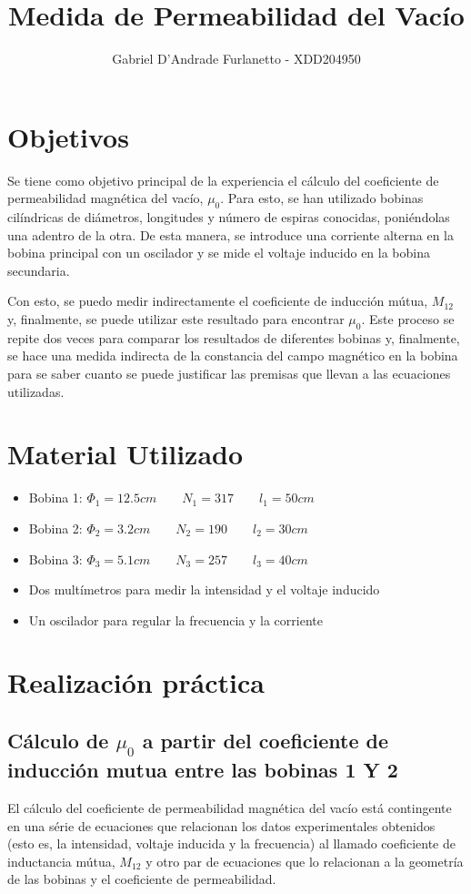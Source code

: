 \documentclass[a4paper,12pt]{article}
\begin{document}
\title{Medida de Permeabilidad del Vacío}

\author{Gabriel D'Andrade Furlanetto - XDD204950}

\maketitle
\section{Objetivos}
Se tiene como objetivo principal de la experiencia el cálculo del coeficiente de permeabilidad magnética del vacío, $\mu_0$. Para esto, se han utilizado bobinas cilíndricas de diámetros, longitudes y número de espiras conocidas, 
poniéndolas una adentro de la otra. De esta manera, se introduce una corriente alterna en la bobina principal con un oscilador y se mide el voltaje inducido en la bobina secundaria. 

Con esto, se puedo medir indirectamente el coeficiente de inducción mútua, $M_{12}$ y, finalmente, se puede utilizar este resultado para encontrar $\mu_0$.
Este proceso se repite dos veces para comparar los resultados de diferentes bobinas y, finalmente, se hace una medida indirecta de la constancia del campo magnético en la bobina para se saber cuanto se puede justificar las premisas que llevan a las ecuaciones utilizadas.


\section{Material Utilizado}
\begin{itemize}
    \item Bobina 1: $\Phi_1 = 12.5cm \qquad N_1=317 \qquad l_1=50cm$
    \item Bobina 2:  $\Phi_2 = 3.2cm \qquad N_2=190 \qquad l_2=30cm$
    \item Bobina 3:  $\Phi_3 = 5.1cm \qquad N_3=257 \qquad l_3=40cm$
    \item Dos multímetros para medir la intensidad y el voltaje inducido
    \item Un oscilador para regular la frecuencia y la corriente
\end{itemize}
\section{Realización práctica}

\subsection{Cálculo de $\mu_0$ a partir del coeficiente de inducción mutua entre las bobinas 1 Y 2}
El cálculo del coeficiente de permeabilidad magnética del vacío está contingente en una série de ecuaciones que relacionan los datos experimentales obtenidos (esto es, la intensidad, voltaje inducida y la frecuencia) al llamado coeficiente de inductancia mútua, $M_{12}$ y otro par de ecuaciones que lo relacionan a la geometría de las bobinas y el coeficiente de permeabilidad.
\end{document}
